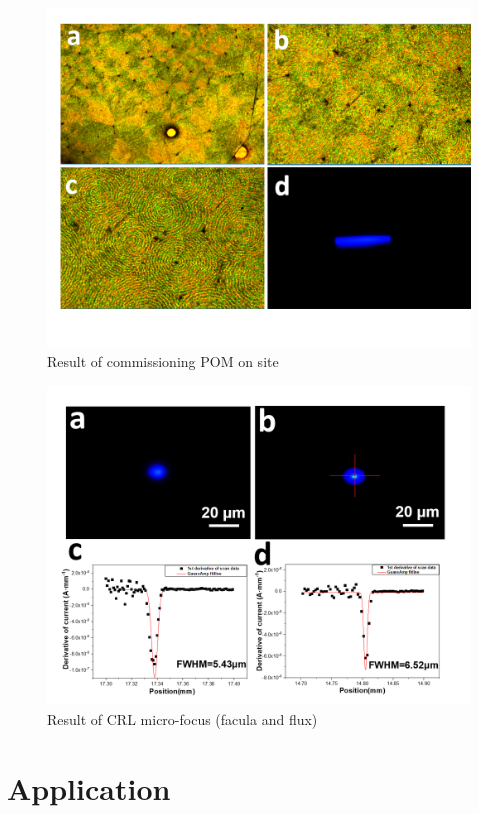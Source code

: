 \documentclass{Head}
\begin{document}
\begin{figure}
    \centering
    \includegraphics[scale=0.6]{Figures/Fig5CommissionPOMOnSite.png}
    \caption{Result of commissioning POM on site}
    \label{pictures}
\end{figure}
\begin{figure}
    \centering
    \includegraphics[scale=0.6]{Figures/Fig6CRLmicrofocus.png}
    \caption{Result of CRL micro-focus (facula and flux)}
    \label{fitting}
\end{figure}
\section{Application}

\end{document}
